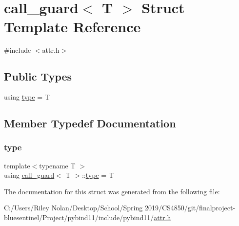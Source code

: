 \hypertarget{structcall__guard_3_01_t_01_4}{}\section{call\+\_\+guard$<$ T $>$ Struct Template Reference}
\label{structcall__guard_3_01_t_01_4}


{\ttfamily \#include $<$attr.\+h$>$}

\subsection*{Public Types}
\begin{DoxyCompactItemize}
\item 
using \mbox{\hyperlink{structcall__guard_3_01_t_01_4_a3098e7fee799eb97e2677066c736905a}{type}} = T
\end{DoxyCompactItemize}


\subsection{Member Typedef Documentation}
\mbox{\label{structcall__guard_3_01_t_01_4_a3098e7fee799eb97e2677066c736905a}} 
\subsubsection{\texorpdfstring{type}{type}}
{\footnotesize\ttfamily template$<$typename T $>$ \\
using \mbox{\hyperlink{structcall__guard}{call\+\_\+guard}}$<$ T $>$\+::\mbox{\hyperlink{structcall__guard_3_01_t_01_4_a3098e7fee799eb97e2677066c736905a}{type}} =  T}



The documentation for this struct was generated from the following file\+:\begin{DoxyCompactItemize}
\item 
C\+:/\+Users/\+Riley Nolan/\+Desktop/\+School/\+Spring 2019/\+C\+S4850/git/finalproject-\/bluesentinel/\+Project/pybind11/include/pybind11/\mbox{\hyperlink{attr_8h}{attr.\+h}}\end{DoxyCompactItemize}
